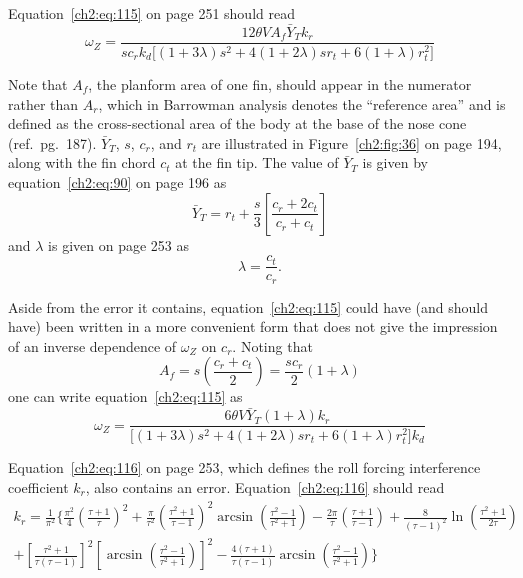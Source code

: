 Equation~\eqref{ch2:eq:115} on page 251 should read
\begin{equation*}
\omega_Z = \frac{12\theta V A_f\bar{Y}_T k_r}{s c_r k_d\bigl[(1 + 3\lambda)s^{2} + 4(1 + 2\lambda)s r_t + 6(1 + \lambda)r_t^{2}\bigr]}
\end{equation*}

Note that $A_f$, the planform area of one fin, should appear in the numerator
rather than $A_r$, which in Barrowman analysis denotes the ``reference area''
and is defined as the cross-sectional area of the body at the base of the nose
cone (ref.\ pg.~187). $\bar{Y}_T$, $s$, $c_r$, and $r_t$ are illustrated in
Figure~\ref{ch2:fig:36} on page 194, along with the fin chord $c_t$ at the fin
tip. The value of $\bar{Y}_T$ is given by equation~\eqref{ch2:eq:90} on page
196 as
\begin{equation*}
\bar{Y}_T = r_t + \frac{s}{3}\left[\frac{c_r + 2c_t}{c_r + c_t}\right]
\end{equation*}
and $\lambda$ is given on page 253 as
\begin{equation*}
\lambda = \frac{c_t}{c_r}.
\end{equation*}

Aside from the error it contains, equation~\eqref{ch2:eq:115} could have (and
should have) been written in a more convenient form that does not give the
impression of an inverse dependence of $\omega_Z$ on $c_r$. Noting that
\begin{equation*}
A_f = s\left(\frac{c_r + c_t}{2}\right) = \frac{s c_r}{2}(1 + \lambda)
\end{equation*}
one can write equation~\eqref{ch2:eq:115} as
\begin{equation*}
\omega_Z = \frac{6\theta V\bar{Y}_T(1 + \lambda)k_r}{\bigl[(1 + 3\lambda)s^{2} + 4(1 + 2\lambda)s r_t + 6(1 + \lambda)r_t^{2}\bigr]k_d}
\end{equation*}

Equation~\eqref{ch2:eq:116} on page 253, which defines the roll forcing
interference coefficient $k_r$, also contains an error.
Equation~\eqref{ch2:eq:116} should read
\begin{multline*}
k_r = \frac{1}{\pi^{2}}\Biggl\{\frac{\pi^{2}}{4}\left(\frac{\tau + 1}{\tau}\right)^{2}
  + \frac{\pi}{\tau^{2}}\left(\frac{\tau^{2} + 1}{\tau - 1}\right)^{2}\arcsin\left(\frac{\tau^{2} - 1}{\tau^{2} + 1}\right)
  - \frac{2\pi}{\tau}\left(\frac{\tau + 1}{\tau - 1}\right)
  + \frac{8}{(\tau - 1)^{2}}\ln\left(\frac{\tau^{2} + 1}{2\tau}\right)\\
  + \left[\frac{\tau^{2} + 1}{\tau(\tau - 1)}\right]^{2}\left[\arcsin\left(\frac{\tau^{2} - 1}{\tau^{2} + 1}\right)\right]^{2}
  - \frac{4(\tau + 1)}{\tau(\tau - 1)}\arcsin\left(\frac{\tau^{2} - 1}{\tau^{2} + 1}\right)\Biggr\}
\end{multline*}


